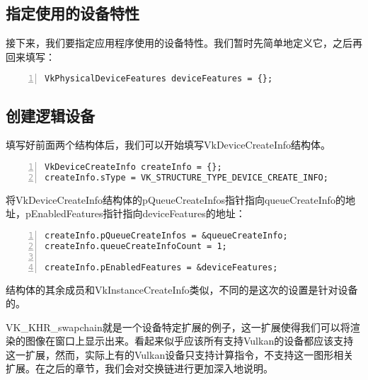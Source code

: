 \documentclass{ctexart}
\begin{document}
\subsection{指定使用的设备特性}

接下来，我们要指定应用程序使用的设备特性。我们暂时先简单地定义它，之后再回来填写：

\begin{lstlisting}[language={[ANSI]C},keywordstyle=\color{blue!70},commentstyle=\color{red!50!green!50!blue!50},frame=shadowbox, rulesepcolor=\color{red!20!green!20!blue!20},basicstyle=\small,numbers=left, numberstyle=\tiny,breaklines=true]
VkPhysicalDeviceFeatures deviceFeatures = {};
\end{lstlisting}

\subsection{创建逻辑设备}

填写好前面两个结构体后，我们可以开始填写VkDeviceCreateInfo结构体。

\begin{lstlisting}[language={[ANSI]C},keywordstyle=\color{blue!70},commentstyle=\color{red!50!green!50!blue!50},frame=shadowbox, rulesepcolor=\color{red!20!green!20!blue!20},basicstyle=\small,numbers=left, numberstyle=\tiny,breaklines=true]
VkDeviceCreateInfo createInfo = {};
createInfo.sType = VK_STRUCTURE_TYPE_DEVICE_CREATE_INFO;
\end{lstlisting}

将VkDeviceCreateInfo结构体的pQueueCreateInfos指针指向queueCreateInfo的地址，pEnabledFeatures指针指向deviceFeatures的地址：

\begin{lstlisting}[language={[ANSI]C},keywordstyle=\color{blue!70},commentstyle=\color{red!50!green!50!blue!50},frame=shadowbox, rulesepcolor=\color{red!20!green!20!blue!20},basicstyle=\small,numbers=left, numberstyle=\tiny,breaklines=true]
createInfo.pQueueCreateInfos = &queueCreateInfo;
createInfo.queueCreateInfoCount = 1;

createInfo.pEnabledFeatures = &deviceFeatures;
\end{lstlisting}

结构体的其余成员和VkInstanceCreateInfo类似，不同的是这次的设置是针对设备的。

VK\_KHR\_swapchain就是一个设备特定扩展的例子，这一扩展使得我们可以将渲染的图像在窗口上显示出来。看起来似乎应该所有支持Vulkan的设备都应该支持这一扩展，然而，实际上有的Vulkan设备只支持计算指令，不支持这一图形相关扩展。在之后的章节，我们会对交换链进行更加深入地说明。
\end{document}

